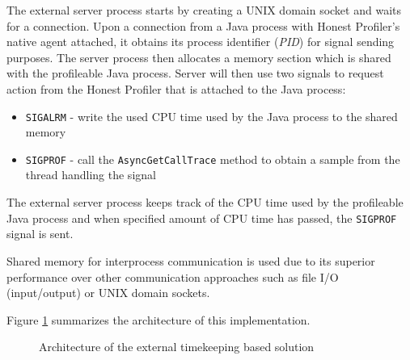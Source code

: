 \documentclass[..thesis.tex]{subfiles}
\begin{document}
The external server process starts by creating a UNIX domain socket and waits for a connection. Upon a connection from a Java process with Honest Profiler's native agent attached, it obtains its process identifier (\textit{PID}) for signal sending purposes. The server process then allocates a memory section which is shared with the profileable Java process. Server will then use two signals to request action from the Honest Profiler that is attached to the Java process:

\begin{itemize}
	\item \texttt{SIGALRM} - write the used CPU time used by the Java process to the shared memory
	\item \texttt{SIGPROF} - call the \texttt{Async\-Get\-Call\-Trace} method to obtain a sample from the thread handling the signal
\end{itemize}

The external server process keeps track of the CPU time used by the profileable Java process and when specified amount of CPU time has passed, the \texttt{SIGPROF} signal is sent.

Shared memory for interprocess communication is used due to its superior performance over other communication approaches such as file I/O (input/output) or UNIX domain sockets. 

Figure \ref{fig:shared_mem_arctitecture} summarizes the architecture of this implementation.
\begin{figure}[h]
\centering
{}
\caption{Architecture of the external timekeeping based solution}
\label{fig:shared_mem_arctitecture}
\end{figure}
\end{document}
